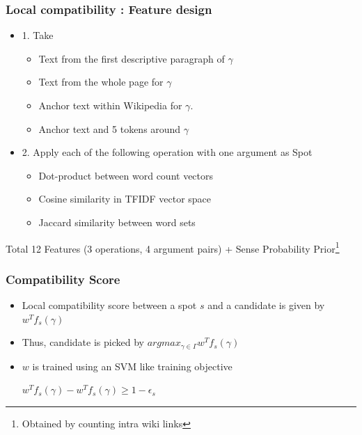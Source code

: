 \begin{frame}

\frametitle{Local compatibility : Feature design} 
\begin{itemize}
 \item 1. Take
\begin{itemize} 
 \item Text from the first descriptive paragraph of $\gamma$
  \item Text from the whole page for $\gamma$
  \item Anchor text within Wikipedia for $\gamma$.
  \item Anchor text and 5 tokens around $\gamma$ 
 \end{itemize}
 
 \item 2. Apply each of the following operation with one argument as Spot
    \begin{itemize}
      \item{Dot-product between word count vectors}
      \item{Cosine similarity in TFIDF vector space}
      \item{Jaccard similarity between word sets}
 \end{itemize} 
 \end{itemize}
 Total 12 Features (3 operations, 4 argument pairs) + Sense Probability Prior\footnote{Obtained by counting intra wiki links}
 
\end{frame}

\begin{frame}
 \frametitle{Compatibility Score}
 \begin{itemize}
 \item Local compatibility score between a spot $s$ and a candidate is given by $w^{T}f_s(\gamma)$
 \item Thus, candidate is picked by $argmax_{\gamma\in\Gamma}w^{T}f_s(\gamma)$
 \item $w$ is trained using an SVM like training objective
 \begin{center} $w^{T}f_s(\gamma) - w^{T}f_s(\gamma) \geq 1 - \epsilon_s$ \end{center}
 \end{itemize}
 
 \end{frame}

